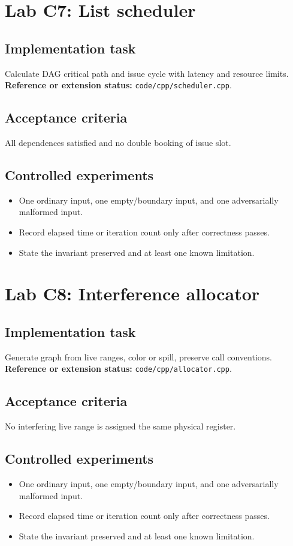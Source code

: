 \documentclass[10pt,letterpaper]{article}
\begin{document}
\section{Lab C7: List scheduler}
\subsection{Implementation task}
Calculate DAG critical path and issue cycle with latency and resource limits.
\textbf{Reference or extension status:} \texttt{code/cpp/scheduler.cpp}.\par\subsection{Acceptance criteria}
All dependences satisfied and no double booking of issue slot.
\subsection{Controlled experiments}
\begin{itemize}
\item One ordinary input, one empty/boundary input, and one adversarially malformed input.
\item Record elapsed time or iteration count only after correctness passes.
\item State the invariant preserved and at least one known limitation.
\end{itemize}


\section{Lab C8: Interference allocator}
\subsection{Implementation task}
Generate graph from live ranges, color or spill, preserve call conventions.
\textbf{Reference or extension status:} \texttt{code/cpp/allocator.cpp}.\par\subsection{Acceptance criteria}
No interfering live range is assigned the same physical register.
\subsection{Controlled experiments}
\begin{itemize}
\item One ordinary input, one empty/boundary input, and one adversarially malformed input.
\item Record elapsed time or iteration count only after correctness passes.
\item State the invariant preserved and at least one known limitation.
\end{itemize}
\end{document}
